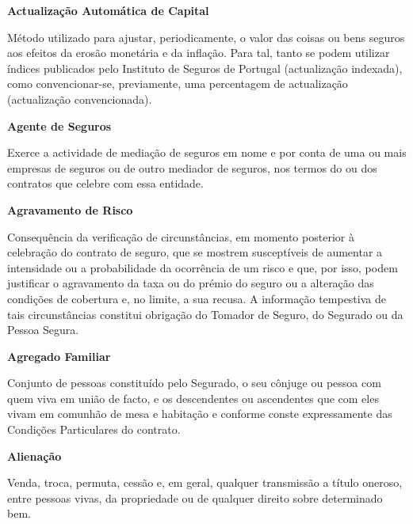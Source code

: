 \begin{description}
\item \textbf{Actualização Automática de Capital}

Método utilizado para ajustar, periodicamente, o valor das coisas ou bens seguros aos efeitos da erosão monetária e da inflação. Para tal, tanto se podem utilizar índices publicados pelo Instituto de Seguros de Portugal (actualização indexada), como convencionar-se, previamente, uma percentagem de actualização (actualização convencionada).
\end{description}

\begin{description}
\item \textbf{Agente de Seguros}

Exerce a actividade de mediação de seguros em nome e por conta de uma ou mais empresas de seguros ou de outro mediador de seguros, nos termos do ou dos contratos que celebre com essa entidade.
\end{description}

\begin{description}
\item \textbf{Agravamento de Risco}

Consequência da verificação de circunstâncias, em momento posterior à celebração do contrato de seguro, que se mostrem susceptíveis de aumentar a intensidade ou a probabilidade da ocorrência de um risco e que, por isso, podem justificar o agravamento da taxa ou do prémio do seguro ou a alteração das condições de cobertura e, no limite, a sua recusa. A informação tempestiva de tais circunstâncias constitui obrigação do Tomador de Seguro, do Segurado ou da Pessoa Segura.
\end{description}

\begin{description}
\item \textbf{Agregado Familiar}

Conjunto de pessoas constituído pelo Segurado, o seu cônjuge ou pessoa com quem viva em união de facto, e os descendentes ou ascendentes que com eles vivam em comunhão de mesa e habitação e conforme conste expressamente das Condições Particulares do contrato.
\end{description}

\begin{description}
\item \textbf{Alienação}

Venda, troca, permuta, cessão e, em geral, qualquer transmissão a título oneroso, entre pessoas vivas, da propriedade ou de qualquer direito sobre determinado bem.
\end{description}

